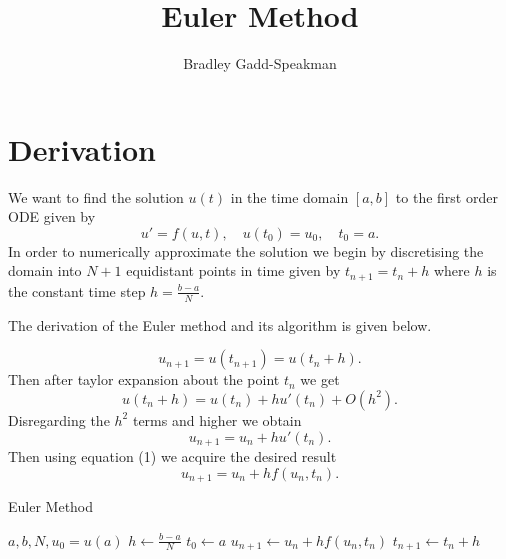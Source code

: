 \documentclass{article}
\title{Euler Method}
\author{Bradley Gadd-Speakman}
\begin{document}
\maketitle

\newpage

\section{Derivation}

We want to find the solution $u(t)$ in the time domain $[a, b]$ to 
the first order ODE given by
\begin{equation}
u' = f(u, t),\quad u(t_0) = u_0,\quad t_0 = a.
\end{equation}
In order to numerically approximate the solution we begin by 
discretising the domain into $N+1$ equidistant points in time 
given by $t_{n+1} = t_n + h$ where $h$ is the constant time step 
$h = \frac{b-a}{N}$. \newline

\noindent The derivation of the Euler method and its algorithm is 
given below.

\begin{equation}
u_{n+1} = u(t_{n+1}) = u(t_n + h).
\end{equation}
Then after taylor expansion about the point $t_n$ we get
\begin{equation}
u(t_n+h) = u(t_n) + hu'(t_n) + O(h^2).
\end{equation}
Disregarding the $h^2$ terms and higher we obtain
\begin{equation}
u_{n+1} = u_n + hu'(t_n).
\end{equation}
Then using equation (1) we acquire the desired result
\begin{equation}
u_{n+1} = u_n + hf(u_n, t_n).
\end{equation}

\begin{algorithm}
\caption{Euler Method}
\begin{algorithmic}[1]
\Require $a, b, N, u_0 = u(a)$
\State $h \gets \frac{b-a}{N}$
\State $t_0 \gets a$
    \State $u_{n+1} \gets u_n + hf(u_n, t_n)$
    \State $t_{n+1} \gets t_n + h$
\EndFor

\end{algorithmic}
\end{algorithm}
\end{document}
